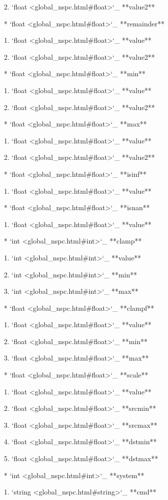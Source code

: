 		2. `float <global_nspc.html#float>`_ **value2**

	* `float <global_nspc.html#float>`_ **remainder**

		1. `float <global_nspc.html#float>`_ **value**

		2. `float <global_nspc.html#float>`_ **value2**

	* `float <global_nspc.html#float>`_ **min**

		1. `float <global_nspc.html#float>`_ **value**

		2. `float <global_nspc.html#float>`_ **value2**

	* `float <global_nspc.html#float>`_ **max**

		1. `float <global_nspc.html#float>`_ **value**

		2. `float <global_nspc.html#float>`_ **value2**

	* `float <global_nspc.html#float>`_ **isinf**

		1. `float <global_nspc.html#float>`_ **value**

	* `float <global_nspc.html#float>`_ **isnan**

		1. `float <global_nspc.html#float>`_ **value**

	* `int <global_nspc.html#int>`_ **clamp**

		1. `int <global_nspc.html#int>`_ **value**

		2. `int <global_nspc.html#int>`_ **min**

		3. `int <global_nspc.html#int>`_ **max**

	* `float <global_nspc.html#float>`_ **clampf**

		1. `float <global_nspc.html#float>`_ **value**

		2. `float <global_nspc.html#float>`_ **min**

		3. `float <global_nspc.html#float>`_ **max**

	* `float <global_nspc.html#float>`_ **scale**

		1. `float <global_nspc.html#float>`_ **value**

		2. `float <global_nspc.html#float>`_ **srcmin**

		3. `float <global_nspc.html#float>`_ **srcmax**

		4. `float <global_nspc.html#float>`_ **dstmin**

		5. `float <global_nspc.html#float>`_ **dstmax**

	* `int <global_nspc.html#int>`_ **system**

		1. `string <global_nspc.html#string>`_ **cmd**

